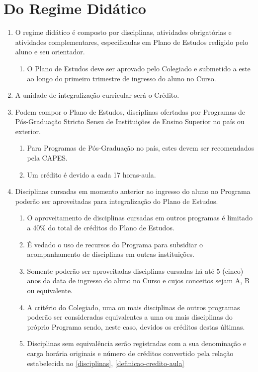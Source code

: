 \documentclass{article}
\newcommand{\singleitem}{\item[Parágrafo Único.]}
\newcommand{\grupoMenor}{Colegiado\xspace}
\begin{document}
\section{Do Regime Didático}
\begin{enumerate}
	\item O regime didático é composto por disciplinas, atividades obrigatórias e atividades complementares, especificadas em Plano de Estudos redigido pelo aluno e seu orientador.
	\begin{enumerate}
		\singleitem O Plano de Estudos deve ser aprovado pelo \grupoMenor e submetido a este ao longo do primeiro trimestre de ingresso do aluno no Curso.
	\end{enumerate}

	\item A unidade de integralização curricular será o Crédito.

	\item \label{disciplinas} Podem compor o Plano de Estudos, disciplinas ofertadas por Programas de Pós-Graduação Stricto Sensu de Instituições de Ensino Superior no país ou exterior.
	\begin{enumerate}
		\item Para Programas de Pós-Graduação no país, estes devem ser recomendados pela CAPES.
		\item \label{definicao-credito-aula} Um crédito é devido a cada 17 horas-aula.
	\end{enumerate}

	\item Disciplinas cursadas em momento anterior ao ingresso do aluno no Programa poderão ser aproveitadas para integralização do Plano de Estudos.
	\begin{enumerate}
		\item O aproveitamento de disciplinas cursadas em outros programas é limitado a 40\% do total de créditos do Plano de Estudos.
		\item É vedado o uso de recursos do Programa para subsidiar o acompanhamento de disciplinas em outras instituições.
		\item Somente poderão ser aproveitadas disciplinas cursadas há até 5 (cinco) anos da data de ingresso do aluno no Curso e cujos conceitos sejam A, B ou equivalente.
		\item A critério do \grupoMenor, uma ou mais disciplinas de outros programas poderão ser consideradas equivalentes a uma ou mais disciplinas do próprio Programa sendo, neste caso, devidos os créditos destas últimas.
		\item Disciplinas sem equivalência serão registradas com a sua denominação e carga horária originais e número de créditos convertido pela relação estabelecida no \ref{disciplinas}, \ref{definicao-credito-aula}
	\end{enumerate}


\end{enumerate}
\end{document}
